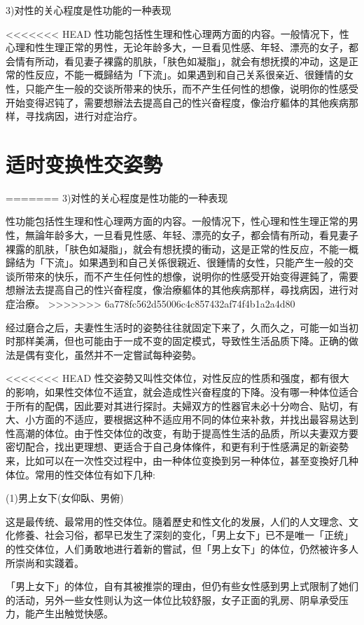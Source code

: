 \documentclass[12pt,UTF8]{ctexbook}
\begin{document}
3)对性的关心程度是性功能的一种表现

<<<<<<< HEAD
性功能包括性生理和性心理两方面的内容。一般情况下，性心理和性生理正常的男性，无论年龄多大，一旦看见性感、年轻、漂亮的女子，都会情有所动，看见妻子裸露的肌肤，「肤色如凝脂」，就会有想抚摸的冲动，这是正常的性反应，不能一概歸结为「下流」。如果遇到和自己关系很亲近、很鍾情的女性，只能产生一般的交谈所带来的快乐，而不产生任何性的想像，说明你的性感受开始变得迟钝了，需要想辦法去提高自己的性兴奋程度，像治疗軀体的其他疾病那样，寻找病因，进行对症治疗。

\section{适时变换性交姿勢}
=======
3)对性的关心程度是性功能的一种表现

性功能包括性生理和性心理两方面的内容。一般情况下，性心理和性生理正常的男性，無論年龄多大，一旦看見性感、年轻、漂亮的女子，都会情有所动，看見妻子裸露的肌肤，「肤色如凝脂」，就会有想抚摸的衝动，这是正常的性反应，不能一概歸结为「下流」。如果遇到和自己关係很親近、很鍾情的女性，只能产生一般的交谈所带來的快乐，而不产生任何性的想像，说明你的性感受开始变得遲鈍了，需要想辦法去提高自己的性兴奋程度，像治療軀体的其他疾病那样，尋找病因，进行对症治療。
>>>>>>> 6a778fc562d55006c4c857432af74f4b1a2a4d80

经过磨合之后，夫妻性生活时的姿勢往往就固定下来了，久而久之，可能一如当初时那样美满，但也可能由于一成不变的固定模式，导致性生活品质下降。正确的做法是偶有变化，虽然并不一定嘗試每种姿勢。

<<<<<<< HEAD
性交姿勢又叫性交体位，对性反应的性质和强度，都有很大的影响，如果性交体位不适宜，就会造成性兴奋程度的下降。没有哪一种体位适合于所有的配偶，因此要对其进行探討。夫婦双方的性器官未必十分吻合、贴切，有大、小方面的不适应，要根据这种不适应用不同的体位来补救，并找出最容易达到性高潮的体位。由于性交体位的改变，有助于提高性生活的品质，所以夫妻双方要密切配合，找出更理想、更适合于自己身体條件，和更有利于性感满足的新姿勢来，比如可以在一次性交过程中，由一种体位变換到另一种体位，甚至变換好几种体位。常用的性交体位有如下几种:

(1)男上女下(女仰臥、男俯)

这是最传统、最常用的性交体位。隨着歷史和性文化的发展，人们的人文理念、文化修養、社会习俗，都早已发生了深刻的变化，「男上女下」已不是唯一「正统」的性交体位，人们勇敢地进行着新的嘗試，但「男上女下」的体位，仍然被许多人所崇尚和实踐着。

「男上女下」的体位，自有其被推崇的理由，但仍有些女性感到男上式限制了她们的活动，另外一些女性则认为这一体位比较舒服，女子正面的乳房、阴阜承受压力，能产生出触觉快感。
\end{document}
